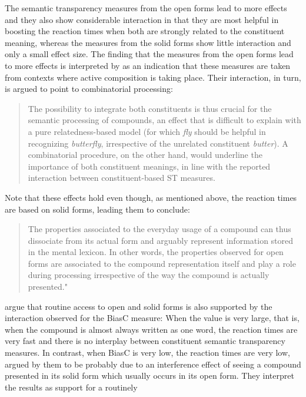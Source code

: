 The semantic transparency measures from the open forms lead to more
effects and they also show considerable interaction in that they are 
most helpful in boosting the reaction times when both are strongly
related to the constituent meaning, whereas the measures from
the solid forms show little interaction and only a small effect
size. The finding that the measures from the open forms lead to more effects is
interpreted by \citet{Marellietal:2014} as an indication that these measures
are taken from contexts where active composition is taking place. Their
interaction, in turn, is argued to point to combinatorial processing: 
\begin{quotation}
The possibility to integrate both constituents is thus
   crucial for the semantic processing of compounds, an effect that is
   difficult to explain with a pure relatedness-based model (for which
   \emph{fly} should be helpful in recognizing \emph{butterfly},
   irrespective of the unrelated constituent \emph{butter}). A
   combinatorial procedure, on the other hand, would underline the
   importance of both constituent meanings, in line with the reported
   interaction between constituent-based ST measures. \citep[1434]{Marellietal:2014}
  \end{quotation}
Note that these effects hold even though, as mentioned above, the
reaction times are based on solid forms, leading them to conclude:
\begin{quotation}
The properties
associated to the everyday usage of a compound can thus dissociate from its actual
form and arguably represent information stored in the mental lexicon. In other
words, the properties observed for open forms are associated to the compound
representation itself and play a role during processing irrespective of the way the
compound is actually presented." \citep[1434]{Marellietal:2014}  
\end{quotation}
\citet[1434]{Marellietal:2014} argue that routine access to open and solid forms is also supported by the interaction observed for the 
BiasC measure: When the
value is very large, that is, when the compound is almost always
written as one word, the reaction times are very fast and there is no
interplay between constituent semantic transparency measures. In
contrast, when BiasC is very low, the reaction times are very low,
argued by them to be probably due to an interference effect of seeing
a compound presented in its solid form which usually occurs in its
open form.
They interpret the results as support for a routinely
